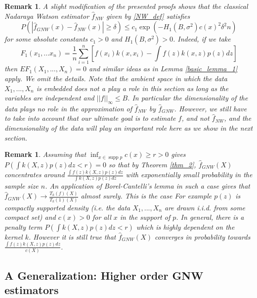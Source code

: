 \documentclass{article}
\newtheorem{remark}[theorem]{Remark}
\DeclareMathOperator\supp{supp}
\begin{document}
\begin{remark} A slight modification of the presented proofs shows that the classical Nadaraya Watson estimator $\hat{f}_{NW}$ given by \ref{NW_def} satisfies 
\begin{equation*}
    P(|\hat{f}_{GNW}(x)-\hat{f}_{NW}(x)|\geq \delta)\leq c_1\exp(-H_1(B,\sigma^2)c(x)^2\delta^2n)
\end{equation*}
for some absolute constants $c_1>0$ and $H_1(B,\sigma^2)>0$.
Indeed, if we take
\begin{equation*}
    F_1(x_1,...x_n)=\frac{1}{n}\sum_{i=1}^n [f(x_i)k(x,x_i)-\int f(z)k(x,z)p(z)dz]
\end{equation*}
then $EF_1(X_1,...,X_n)=0$ and similar ideas as in Lemma \ref{basic_lemma_1} apply. We omit the details. Note that the ambient space in which the data  $X_1,...,X_n$ is embedded does not a play a role in this section as long as the variables are independent and $||f||_{\infty}\leq B$. In particular the dimensionality of the data plays no role in the approximation of $\hat{f}_{NW}$ by $\hat{f}_{GNW}$. However, we still have to take into account that our ultimate goal is to estimate $f$, and not $\hat{f}_{NW}$, and the dimensionality of the data will play an important role here as we show in the next section.
\end{remark}




\begin{remark}
Assuming that $\inf_{x\in\supp{p}} c(x)\geq r>0$ gives $P(\int k(X,z)p(z)dz<r)=0$ so that by Theorem \ref{thm_2}, $\hat{f}_{GNW}(X)$ concentrates around $\frac{\int f(z)k(X,z)p(z)dz}{\int k(X,z)p(z)dz}$ with exponentially small probability in the sample size $n$. An application of Borel-Cantelli's lemma in such a case gives that $\hat{f}_{GNW}(X)\rightarrow \frac{T_k(f)(X)}{T_k(1)(X)}$ almost surely. This is the case For example $p(z)$ is compactly supported density (i.e. the data $X_1,...,X_n$ are drawn i.i.d. from some compact set) and $c(x)>0$ for all $x$ in the support of $p$. In general, there is a penalty term $P(\int k(X,z)p(z)dz<r)$ which is highly dependent on the kernel $k$. However it is still true that $\hat{f}_{GNW}(X)$ converges in probability towards $\frac{\int f(z)k(X,z)p(z)dz}{c(X)}$.
\end{remark}


\subsection{A Generalization: Higher order GNW estimators}
\end{document}
